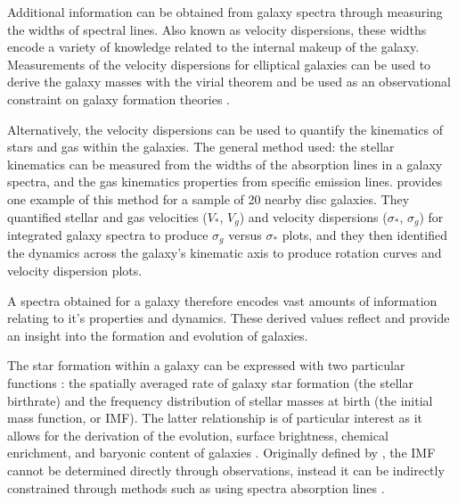 \documentclass[12pt, twocolumn, nofootinbib]{revtex4-1}    %
\begin{document}
Additional information can be obtained from galaxy spectra through measuring the widths of spectral lines. Also known as velocity dispersions, these widths encode a variety of knowledge related to the internal makeup of the galaxy. Measurements of the velocity dispersions for elliptical galaxies can be used to derive the galaxy masses with the virial theorem \citep{1958BOTT....2q...8P} and be used as an observational constraint on galaxy formation theories \citep{1964ApJ...139..284F}.

Alternatively, the velocity dispersions can be used to quantify the kinematics of stars and gas within the galaxies. The general method used: the stellar kinematics can be measured from the widths of the absorption lines in a galaxy spectra, and the gas kinematics properties from specific emission lines. \cite{2001A&A...374..394V} provides one example of this method for a sample of 20 nearby disc galaxies. They quantified stellar and gas velocities ($V_*$, $V_g$) and velocity dispersions ($\sigma_*$, $\sigma_g$) for integrated galaxy spectra to produce $\sigma_g$ versus $\sigma_*$ plots, and they then identified the dynamics across the galaxy's kinematic axis to produce rotation curves and velocity dispersion plots. 

A spectra obtained for a galaxy therefore encodes vast amounts of information relating to it's properties and dynamics. These derived values reflect and provide an insight into the formation and evolution of galaxies. 

The star formation within a galaxy can be expressed with two particular functions \citep{1979ApJS...41..513M}: the spatially averaged rate of galaxy star formation (the stellar birthrate) and the frequency distribution of stellar masses at birth (the initial mass function, or IMF). The latter relationship is of particular interest as it allows for the derivation of the evolution, surface brightness, chemical enrichment, and baryonic content of galaxies \citep{2003PASP..115..763C}. Originally defined by \cite{1955ApJ...121..161S}, the IMF cannot be determined directly through observations, instead it can be indirectly constrained through methods such as using spectra absorption lines \citep{2012ApJ...760...70V}.
\end{document}
